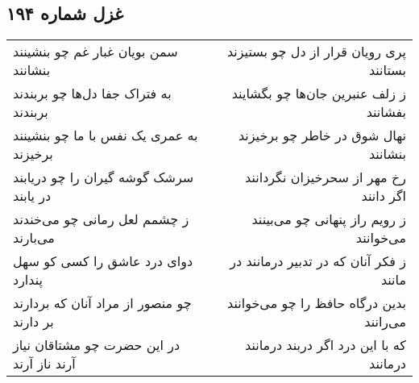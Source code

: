 \begin{center}
\section*{غزل شماره ۱۹۴}
\label{sec:sh194}
\begin{longtable}{l p{0.5cm} r}
سمن بویان غبار غم چو بنشینند بنشانند
&&
پری رویان قرار از دل چو بستیزند بستانند
\\
به فتراک جفا دل‌ها چو بربندند بربندند
&&
ز زلف عنبرین جان‌ها چو بگشایند بفشانند
\\
به عمری یک نفس با ما چو بنشینند برخیزند
&&
نهال شوق در خاطر چو برخیزند بنشانند
\\
سرشک گوشه گیران را چو دریابند در یابند
&&
رخ مهر از سحرخیزان نگردانند اگر دانند
\\
ز چشمم لعل رمانی چو می‌خندند می‌بارند
&&
ز رویم راز پنهانی چو می‌بینند می‌خوانند
\\
دوای درد عاشق را کسی کو سهل پندارد
&&
ز فکر آنان که در تدبیر درمانند در مانند
\\
چو منصور از مراد آنان که بردارند بر دارند
&&
بدین درگاه حافظ را چو می‌خوانند می‌رانند
\\
در این حضرت چو مشتاقان نیاز آرند ناز آرند
&&
که با این درد اگر دربند درمانند درمانند
\\
\end{longtable}
\end{center}
